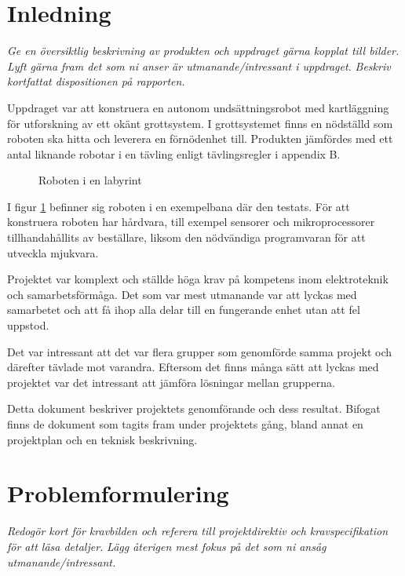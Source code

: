 \documentclass[11pt]{article}
\begin{document}
\begin{flushleft}
\section{Inledning}
\textit{Ge en översiktlig beskrivning av produkten och uppdraget gärna kopplat till bilder.}
\textit{Lyft gärna fram det som ni anser är utmanande/intressant i uppdraget.}
\textit{Beskriv kortfattat dispositionen på rapporten.}

Uppdraget var att konstruera en autonom undsättningsrobot med kartläggning för utforskning av ett okänt grottsystem. I grottsystemet finns en nödställd som roboten ska hitta och leverera en förnödenhet till. Produkten jämfördes med ett antal liknande robotar i en tävling enligt tävlingsregler i appendix B.

\begin{figure}[!htbp]
\centering
\noindent{}
	\caption{Roboten i en labyrint \label{scene}}	
\end{figure}

I figur \ref{scene} befinner sig roboten i en exempelbana där den testats. För att konstruera roboten har hårdvara, till exempel sensorer och mikroprocessorer tillhandahållits av beställare, liksom den nödvändiga programvaran för att utveckla mjukvara.

Projektet var komplext och ställde höga krav på kompetens inom elektroteknik och samarbetsförmåga. Det som var mest utmanande var att lyckas med samarbetet och att få ihop alla delar till en fungerande enhet utan att fel uppstod. 

Det var intressant att det var flera grupper som genomförde samma projekt och därefter tävlade mot varandra. Eftersom det finns många sätt att lyckas med projektet var det intressant att jämföra lösningar mellan grupperna.

Detta dokument beskriver projektets genomförande och dess resultat. Bifogat finns de dokument som tagits fram under projektets gång, bland annat en projektplan och en teknisk beskrivning.



\pagebreak

\section{Problemformulering}
\textit{Redogör kort för kravbilden och referera till projektdirektiv och kravspecifikation för att läsa detaljer.}
\textit{Lägg återigen mest fokus på det som ni ansåg utmanande/intressant.}


\end{flushleft}
\end{document}
